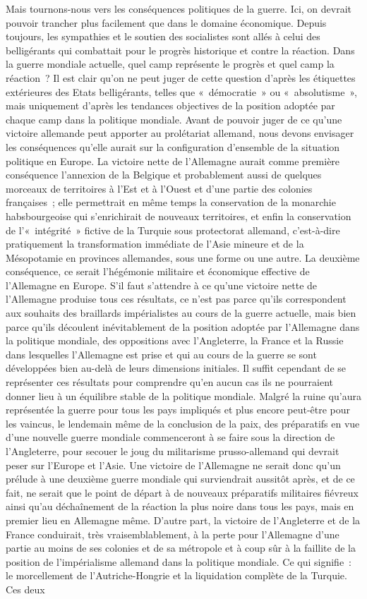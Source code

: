 \documentclass[french,twoside]{book} %
\begin{document}
Mais tournons-nous vers les conséquences politiques de la guerre. Ici, on devrait pouvoir trancher plus facilement que dans le domaine économique. Depuis toujours, les sympathies et le soutien des socialistes sont allés à celui des belligérants qui combattait pour le progrès historique et contre la réaction. Dans la guerre mondiale actuelle, quel camp représente le progrès et quel camp la réaction ? Il est clair qu’on ne peut juger de cette question d’après les étiquettes extérieures des Etats belligérants, telles que « démocratie » ou « absolutisme », mais uniquement d’après les tendances objectives de la position adoptée par chaque camp dans la politique mondiale. Avant de pouvoir juger de ce qu’une victoire allemande peut apporter au prolétariat allemand, nous devons envisager les conséquences qu’elle aurait sur la configuration d’ensemble de la situation politique en Europe. La victoire nette de l’Allemagne aurait comme première conséquence l’annexion de la Belgique et probablement aussi de quelques morceaux de territoires à l’Est et à l’Ouest et d’une partie des colonies françaises ; elle permettrait en même temps la conservation de la monarchie habsbourgeoise qui s’enrichirait de nouveaux territoires, et enfin la conservation de l’« intégrité » fictive de la Turquie sous protectorat allemand, c’est-à-dire pratiquement la transformation immédiate de l’Asie mineure et de la Mésopotamie en provinces allemandes, sous une forme ou une autre. La deuxième conséquence, ce serait l’hégémonie militaire et économique effective de l’Allemagne en Europe. S'il faut s’attendre à ce qu’une victoire nette de l’Allemagne produise tous ces résultats, ce n’est pas parce qu’ils correspondent aux souhaits des braillards impérialistes au cours de la guerre actuelle, mais bien parce qu’ils découlent inévitablement de la position adoptée par l’Allemagne dans la politique mondiale, des oppositions avec l’Angleterre, la France et la Russie dans lesquelles l’Allemagne est prise et qui au cours de la guerre se sont développées bien au-delà de leurs dimensions initiales. Il suffit cependant de se représenter ces résultats pour comprendre qu’en aucun cas ils ne pourraient donner lieu à un équilibre stable de la politique mondiale. Malgré la ruine qu’aura représentée la guerre pour tous les pays impliqués et plus encore peut-être pour les vaincus, le lendemain même de la conclusion de la paix, des préparatifs en vue d’une nouvelle guerre mondiale commenceront à se faire sous la direction de l’Angleterre, pour secouer le joug du militarisme prusso-allemand qui devrait peser sur l’Europe et l’Asie. Une victoire de l’Allemagne ne serait donc qu’un prélude à une deuxième guerre mondiale qui surviendrait aussitôt après, et de ce fait, ne serait que le point de départ à de nouveaux préparatifs militaires fiévreux ainsi qu’au déchaînement de la réaction la plus noire dans tous les pays, mais en premier lieu en Allemagne même. D'autre part, la victoire de l’Angleterre et de la France conduirait, très vraisemblablement, à la perte pour l’Allemagne d’une partie au moins de ses colonies et de sa métropole et à coup sûr à la faillite de la position de l’impérialisme allemand dans la politique mondiale. Ce qui signifie : le morcellement de l’Autriche-Hongrie et la liquidation complète de la Turquie. Ces deux 
\end{document}
